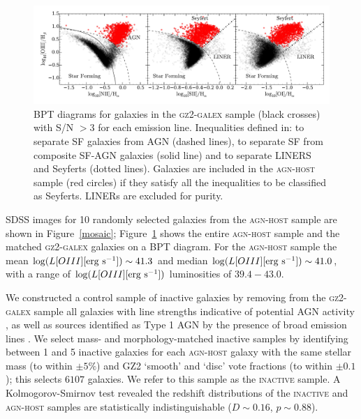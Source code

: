 \begin{figure}
\includegraphics[width=\textwidth]{agn/fig2.pdf}
\caption[BPT diagram used to select AGN host galaxies]{BPT diagrams for galaxies in the \textsc{gz2-galex} sample (black crosses) with S/N $> 3$ for each emission line. Inequalities defined in: \protect\cite{kewley01} to separate SF galaxies from AGN (dashed lines), \protect\cite{kauffmann03b} to separate SF from composite SF-AGN galaxies (solid line) and \protect\cite{kewley06} to separate LINERS and Seyferts (dotted lines). Galaxies are included in the \textsc{agn-host} sample (red circles) if they satisfy all the inequalities to be classified as Seyferts. LINERs are excluded for purity.}
\label{bpt}
\end{figure}

SDSS images for 10 randomly selected galaxies from the \textsc{agn-host} sample are shown in Figure~\ref{mosaic}; Figure~\ref{bpt} shows the entire \textsc{agn-host} sample and the matched \textsc{gz2-galex} galaxies on a BPT diagram.  For the \textsc{agn-host} sample the mean $\log (L[OIII] [\rm{erg~s^{-1}}]) \sim 41.3$ and median $\log (L[OIII] [\rm{erg~s^{-1}}]) \sim 41.0$, with a range of $\log (L[OIII] [\rm{erg~s^{-1}}])$ luminosities of $39.4-43.0$. 


We constructed a control sample of inactive galaxies by removing from the \textsc{gz2-galex} sample all galaxies with line strengths indicative of potential AGN activity \citep*{kauffmann03b}, as well as sources identified as Type 1 AGN by the presence of broad emission lines \citep{Oh15}.  We select mass- and morphology-matched inactive samples by identifying between 1 and 5 inactive galaxies for each \textsc{agn-host} galaxy with the same stellar mass (to within $\pm5\%$) and GZ2 `smooth' and `disc' vote fractions (to within $\pm 0.1$); this selects $6107$ galaxies. We refer to this sample as the \textsc{inactive} sample. A Kolmogorov-Smirnov test revealed the redshift distributions of the \textsc{inactive} and \textsc{agn-host} samples are statistically indistinguishable ($D \sim 0.16$, $p \sim 0.88$). 

